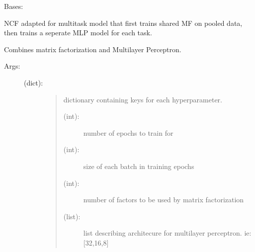\documentclass[letterpaper,10pt,english,openany,oneside]{sphinxmanual}
\begin{document}
\begin{fulllineitems}
\label{\detokenize{ncf:methods.mtl.NCF_MTL.Neural_Collaborative_Filtering_FeaturesMTLMF}}
Bases: {\hyperref[\detokenize{base:methods.base.BaseMTLEstimator}]{}}

NCF adapted for multitask model that first trains shared MF on pooled data, then trains a seperate MLP model for each task.

Combines matrix factorization and Multilayer Perceptron. 
\begin{description}
\item[{Args:}] \leavevmode\begin{description}
\item[{ (dict):}] \leavevmode\begin{quote}

dictionary containing keys for each hyperparameter.
\begin{description}
\item[{ (int):}] \leavevmode
number of epochs to train for

\item[{ (int):}] \leavevmode
size of each batch in training epochs

\item[{ (int):}] \leavevmode
number of factors to be used by matrix factorization

\item[{ (list):}] \leavevmode
list describing architecure for multilayer perceptron. ie: {[}32,16,8{]}


\end{description}
\end{quote}
\end{description}
\end{description}
\end{fulllineitems}
\end{document}
